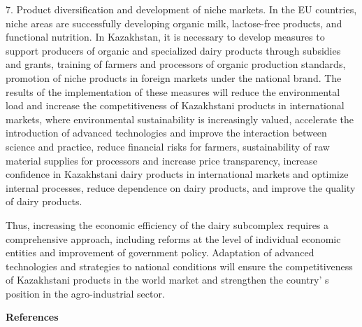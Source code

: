 \begin{multicols}{2}
7. Product diversification and development of niche markets. In the EU
countries, niche areas are successfully developing organic milk,
lactose-free products, and functional nutrition. In Kazakhstan, it is
necessary to develop measures to support producers of organic and
specialized dairy products through subsidies and grants, training of
farmers and processors of organic production standards, promotion of
niche products in foreign markets under the national brand.
The results of the implementation of these measures will reduce the
environmental load and increase the competitiveness of Kazakhstani
products in international markets, where environmental sustainability is
increasingly valued, accelerate the introduction of advanced
technologies and improve the interaction between science and practice,
reduce financial risks for farmers, sustainability of raw material
supplies for processors and increase price transparency, increase
confidence in Kazakhstani dairy products in international markets and
optimize internal processes, reduce dependence on dairy products, and
improve the quality of dairy products.

Thus, increasing the economic efficiency of the dairy subcomplex
requires a comprehensive approach, including reforms at the level of
individual economic entities and improvement of government policy.
Adaptation of advanced technologies and strategies to national
conditions will ensure the competitiveness of Kazakhstani products in
the world market and strengthen the country' s position
in the agro-industrial sector.
\end{multicols}

\begin{center}
{\bfseries References}
\end{center}

